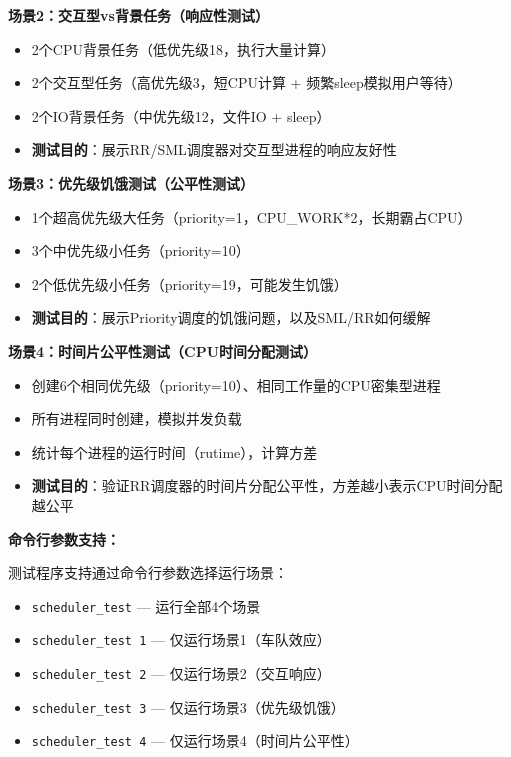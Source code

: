 \documentclass[a4paper, 12pt]{article}
\begin{document}
    \textbf{场景2：交互型vs背景任务（响应性测试）}
    \begin{itemize}[itemsep=2pt]
        \item 2个CPU背景任务（低优先级18，执行大量计算）
        \item 2个交互型任务（高优先级3，短CPU计算 + 频繁sleep模拟用户等待）
        \item 2个IO背景任务（中优先级12，文件IO + sleep）
        \item \textbf{测试目的}：展示RR/SML调度器对交互型进程的响应友好性
    \end{itemize}
    
    \textbf{场景3：优先级饥饿测试（公平性测试）}
    \begin{itemize}[itemsep=2pt]
        \item 1个超高优先级大任务（priority=1，CPU\_WORK*2，长期霸占CPU）
        \item 3个中优先级小任务（priority=10）
        \item 2个低优先级小任务（priority=19，可能发生饥饿）
        \item \textbf{测试目的}：展示Priority调度的饥饿问题，以及SML/RR如何缓解
    \end{itemize}
    
    \textbf{场景4：时间片公平性测试（CPU时间分配测试）}
    \begin{itemize}[itemsep=2pt]
        \item 创建6个相同优先级（priority=10）、相同工作量的CPU密集型进程
        \item 所有进程同时创建，模拟并发负载
        \item 统计每个进程的运行时间（rutime），计算方差
        \item \textbf{测试目的}：验证RR调度器的时间片分配公平性，方差越小表示CPU时间分配越公平
    \end{itemize}
    
    \textbf{命令行参数支持：}
    
    测试程序支持通过命令行参数选择运行场景：
    \begin{itemize}[itemsep=0pt]
        \item \texttt{scheduler\_test} — 运行全部4个场景
        \item \texttt{scheduler\_test 1} — 仅运行场景1（车队效应）
        \item \texttt{scheduler\_test 2} — 仅运行场景2（交互响应）
        \item \texttt{scheduler\_test 3} — 仅运行场景3（优先级饥饿）
        \item \texttt{scheduler\_test 4} — 仅运行场景4（时间片公平性）
    \end{itemize}
    
\end{document}
